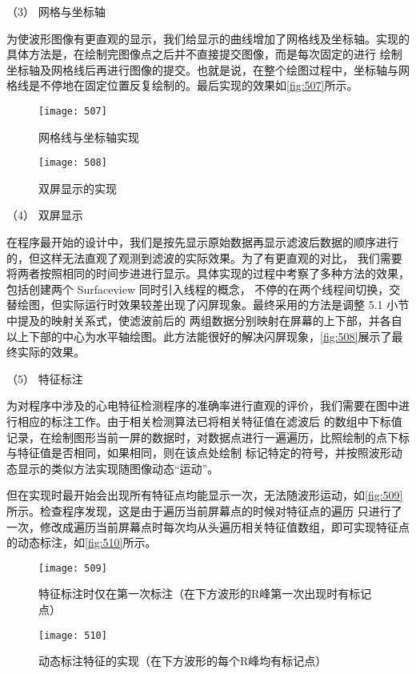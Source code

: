 （3）	网格与坐标轴 

为使波形图像有更直观的显示，我们给显示的曲线增加了网格线及坐标轴。实现的具体方法是，在绘制完图像点之后并不直接提交图像，而是每次固定的进行
绘制坐标轴及网格线后再进行图像的提交。也就是说，在整个绘图过程中，坐标轴与网格线是不停地在固定位置反复绘制的。最后实现的效果如\autoref{fig:507}所示。 
\begin{figure}[htbp]
    \centering
    \texttt{[image: 507]}
    \caption{\label{fig:507}网格线与坐标轴实现 }
\end{figure}
\begin{figure}[htbp]
    \centering
    \texttt{[image: 508]}
    \caption{\label{fig:508}双屏显示的实现}
\end{figure}

（4）	双屏显示 

在程序最开始的设计中，我们是按先显示原始数据再显示滤波后数据的顺序进行的，但这样无法直观了观测到滤波的实际效果。为了有更直观的对比，
我们需要将两者按照相同的时间步进进行显示。具体实现的过程中考察了多种方法的效果，包括创建两个 Surfaceview 同时引入线程的概念，
不停的在两个线程间切换，交替绘图，但实际运行时效果较差出现了闪屏现象。最终采用的方法是调整 5.1 小节中提及的映射关系式，使滤波前后的
两组数据分别映射在屏幕的上下部，并各自以上下部的中心为水平轴绘图。此方法能很好的解决闪屏现象，\autoref{fig:508}展示了最终实际的效果。 

（5）	特征标注 

为对程序中涉及的心电特征检测程序的准确率进行直观的评价，我们需要在图中进行相应的标注工作。由于相关检测算法已将相关特征值在滤波后
的数组中下标值记录，在绘制图形当前一屏的数据时，对数据点进行一遍遍历，比照绘制的点下标与特征值是否相同，如果相同，则在该点处绘制
标记特定的符号，并按照波形动态显示的类似方法实现随图像动态“运动”。 

但在实现时最开始会出现所有特征点均能显示一次，无法随波形运动，如\autoref{fig:509}所示。检查程序发现，这是由于遍历当前屏幕点的时候对特征点的遍历
只进行了一次，修改成遍历当前屏幕点时每次均从头遍历相关特征值数组，即可实现特征点的动态标注，如\autoref{fig:510}所示。 
\begin{figure}[htbp]
    \centering
    \texttt{[image: 509]}
    \caption{\label{fig:509}特征标注时仅在第一次标注（在下方波形的R峰第一次出现时有标记点）}
\end{figure}

\begin{figure}[htbp]
    \centering
    \texttt{[image: 510]}
    \caption{\label{fig:510}动态标注特征的实现（在下方波形的每个R峰均有标记点）}
\end{figure}

